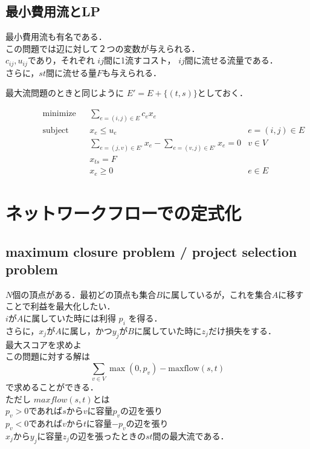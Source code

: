 \documentclass[13pt, a4paper, landscape]{jarticle}
\theoremstyle{nonitalic} %
\begin{document}
\subsection{最小費用流とLP}

最小費用流も有名である． \\
この問題では辺に対して２つの変数が与えられる． \\
$c_{ij}, u_{ij}$であり，それぞれ $ij$間に1流すコスト， $ij$間に流せる流量である． \\
さらに，$st$間に流せる量$F$も与えられる．

最大流問題のときと同じように $E' = E + \{ (t,s) \} $としておく．

\begin{align}
 &&&&&\textrm{minimize}   && \sum_{e=(i,j)\in E} c_e x_e  \\
 &&&&&\textrm{subject to} && x_{e} \leq u_e & e = (i,j) \in E \\
 &&&&&                    && \sum_{e = (j,v) \in E'} x_e - \sum_{e=(v,j) \in E'} x_e= 0 & v \in V  &&&&& \\
 &&&&&                    && x_{ts} = F \\
 &&&&&                    && x_e \geq 0 & e \in E &&&&&
\end{align}



\section{ネットワークフローでの定式化}
\subsection{maximum closure problem / project selection problem}
$N$個の頂点がある．最初どの頂点も集合$B$に属しているが，これを集合$A$に移すことで利益を最大化したい． \\
$i$が$A$に属していた時には利得 $p_i$ を得る． \\
さらに，$x_j$が$A$に属し，かつ$y_j$が$B$に属していた時に$z_j$だけ損失をする． \\
最大スコアを求めよ \\


この問題に対する解は
\[ \sum_{v \in V } \max(0,p_v) - \mathrm{maxflow}(s,t) \]
で求めることができる．\\
ただし $maxflow(s,t) $とは\\
$p_v>0$であれば$s$から$v$に容量$p_v$の辺を張り\\
$p_v<0$であれば$v$から$t$に容量$-p_v$の辺を張り \\
$x_j$から$y_j$に容量$z_j$の辺を張ったときの$st$間の最大流である．
\end{document}
